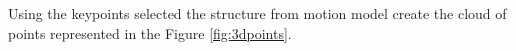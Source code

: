 \documentclass[12pt,a4paper]{article}
\begin{document}
Using the keypoints selected the structure from motion model create the cloud of points represented in  the Figure \ref{fig:3dpoints}.

\begin{figure}[!h]
	\centering
	{
		{
			\setlength{\fboxsep}{1pt}
			\setlength{\fboxrule}{1pt}
		}
		\label{fig:3dpoints1}
	}
	\enskip
	{
		{
			\setlength{\fboxsep}{1pt}
			\setlength{\fboxrule}{1pt}
		}
		\label{fig:3dpoints2}
	}
	\enskip
	{
		{
			\setlength{\fboxsep}{1pt}
			\setlength{\fboxrule}{1pt}
}}
\end{figure}
\end{document}
